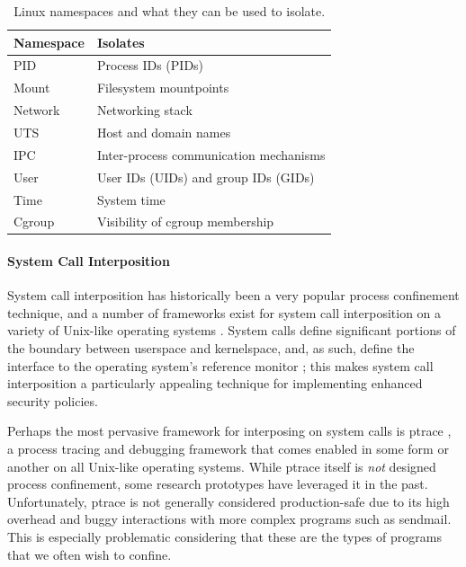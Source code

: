\documentclass[dvipsnames, 12pt]{article}
\begin{document}
\begin{table}
\begin{tabular}{lp{3in}}
    \toprule
    Namespace & Isolates \\
    \midrule
    \multirow{1}{*}{PID} & Process IDs (PIDs)\\
    \multirow{1}{*}{Mount} & Filesystem mountpoints\\
    \multirow{1}{*}{Network} & Networking stack\\
    \multirow{1}{*}{UTS} & Host and domain names\\
    \multirow{1}{*}{IPC} & Inter-process communication mechanisms\\
    \multirow{1}{*}{User} & User IDs (UIDs) and group IDs (GIDs)\\
    \multirow{1}{*}{Time} & System time\\
    \multirow{1}{*}{Cgroup} & Visibility of cgroup membership\\
    \bottomrule
\end{tabular}
\caption{Linux namespaces and what they can be used to isolate.}
\label{tab:namespaces}
\end{table}

\paragraph*{System Call Interposition}
System call interposition has historically been a very popular process
confinement technique, and a number of frameworks exist for system call
interposition on a variety of Unix-like operating systems
\cite{anderson2017_comparison, padala2002_ptrace, watson2010_capsicum, pledge}.
System calls define significant portions of the boundary between userspace
and kernelspace, and, as such, define the interface to the operating system's reference
monitor \cite{anderson1973_reference_monitor}; this makes system call interposition
a particularly appealing technique for implementing enhanced security policies.

Perhaps the most pervasive framework for interposing on system calls is
ptrace \cite{padala2002_ptrace}, a process tracing and debugging framework that
comes enabled in some form or another on all Unix-like operating systems.  While
ptrace itself is \textit{not} designed process confinement, some research
prototypes \cite{goldberg96_janus, jain05_janus2, wagner1999_janus} have
leveraged it in the past. Unfortunately, ptrace is not generally considered
production-safe due to its high overhead and buggy interactions with more
complex programs such as sendmail. This is especially problematic considering
that these are the types of programs that we often wish to confine.
\end{document}

